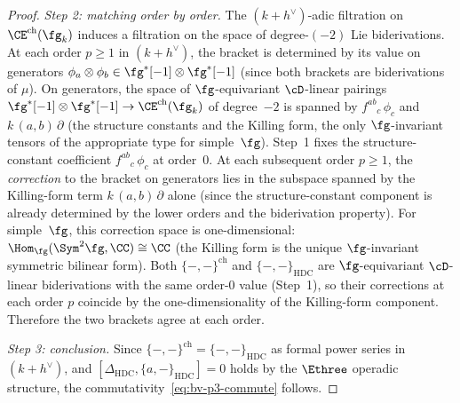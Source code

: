 \begin{proof}
\textit{Step 2: matching order by order.}
The $(k+h^\vee)$-adic filtration on
$\CE^{\mathrm{ch}}(\fg_k)$ induces a filtration on the
space of degree-$(-2)$ Lie biderivations. At each order
$p \geq 1$ in $(k+h^\vee)$, the bracket is determined by
its value on generators
$\phi_a \otimes \phi_b \in \fg^*[-1] \otimes \fg^*[-1]$
(since both brackets are biderivations of $\mu$). On
generators, the space of $\fg$-equivariant $\cD$-linear
pairings $\fg^*[-1] \otimes \fg^*[-1] \to
\CE^{\mathrm{ch}}(\fg_k)$ of degree~$-2$ is spanned by
$f^{ab}{}_c\,\phi_c$ and $k\,(a,b)\,\partial$ (the
structure constants and the Killing form, the only
$\fg$-invariant tensors of the appropriate type for
simple~$\fg$). Step~1 fixes the structure-constant coefficient
$f^{ab}{}_c\,\phi_c$ at order~$0$. At each subsequent
order $p \geq 1$, the \emph{correction} to the bracket on
generators lies in the subspace spanned by the Killing-form
term $k\,(a,b)\,\partial$ alone (since the
structure-constant component is already determined by
the lower orders and the biderivation property).
For simple~$\fg$, this correction space is
one-dimensional: $\Hom_\fg(\Sym^2\fg, \CC) \cong \CC$
(the Killing form is the unique $\fg$-invariant symmetric
bilinear form). Both $\{-,-\}^{\mathrm{ch}}$ and
$\{-,-\}_{\mathrm{HDC}}$ are $\fg$-equivariant
$\cD$-linear biderivations with the same
order-$0$ value (Step~1), so their corrections at each
order $p$ coincide by the one-dimensionality of the
Killing-form component. Therefore the two brackets agree
at each order.

\textit{Step 3: conclusion.}
Since $\{-,-\}^{\mathrm{ch}} = \{-,-\}_{\mathrm{HDC}}$
as formal power series in $(k+h^\vee)$, and
$[\Delta_{\mathrm{HDC}}, \{a,-\}_{\mathrm{HDC}}] = 0$
holds by the $\Ethree$ operadic structure,
the commutativity~\eqref{eq:bv-p3-commute} follows.
\end{proof}

